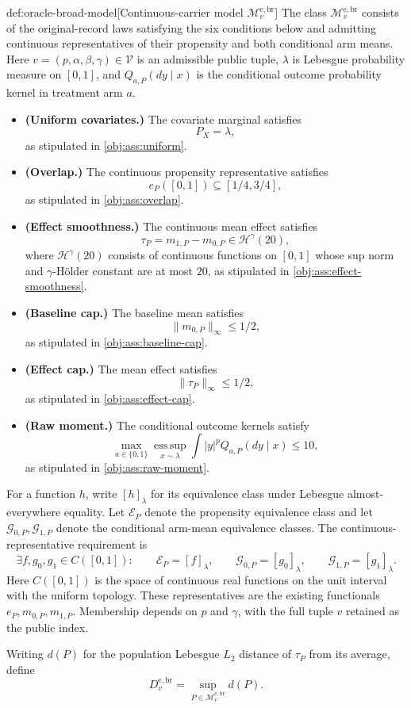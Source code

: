 \begin{definitionv}{def:oracle-broad-model}[Continuous-carrier model \(\mathcal M_v^{\mathrm{e,br}}\)]
The class \(\mathcal M_v^{\mathrm{e,br}}\) consists of the original-record laws satisfying the six conditions below and admitting continuous representatives of their propensity and both conditional arm means. Here \(v=(p,\alpha,\beta,\gamma)\in\mathcal V\) is an admissible public tuple, \(\lambda\) is Lebesgue probability measure on \([0,1]\), and \(Q_{a,P}(dy\mid x)\) is the conditional outcome probability kernel in treatment arm \(a\).
\begin{itemize}
\item \textbf{(Uniform covariates.)} The covariate marginal satisfies
\[
 P_X=\lambda,
\]
as stipulated in \cref{obj:ass:uniform}.
\item \textbf{(Overlap.)} The continuous propensity representative satisfies
\[
 e_P([0,1])\subseteq[1/4,3/4],
\]
as stipulated in \cref{obj:ass:overlap}.
\item \textbf{(Effect smoothness.)} The continuous mean effect satisfies
\[
 \tau_P=m_{1,P}-m_{0,P}\in\mathcal H^\gamma(20),
\]
where \(\mathcal H^\gamma(20)\) consists of continuous functions on \([0,1]\) whose sup norm and \(\gamma\)-Hölder constant are at most \(20\), as stipulated in \cref{obj:ass:effect-smoothness}.
\item \textbf{(Baseline cap.)} The baseline mean satisfies
\[
 \|m_{0,P}\|_\infty\le1/2,
\]
as stipulated in \cref{obj:ass:baseline-cap}.
\item \textbf{(Effect cap.)} The mean effect satisfies
\[
 \|\tau_P\|_\infty\le1/2,
\]
as stipulated in \cref{obj:ass:effect-cap}.
\item \textbf{(Raw moment.)} The conditional outcome kernels satisfy
\[
 \max_{a\in\{0,1\}}\operatorname*{ess\,sup}_{x\sim\lambda}
 \int |y|^p Q_{a,P}(dy\mid x)\le10,
\]
as stipulated in \cref{obj:ass:raw-moment}.
\end{itemize}
For a function \(h\), write \([h]_\lambda\) for its equivalence class under Lebesgue almost-everywhere equality. Let \(\mathcal E_P\) denote the propensity equivalence class and let \(\mathcal G_{0,P},\mathcal G_{1,P}\) denote the conditional arm-mean equivalence classes. The continuous-representative requirement is
\[
 \exists f,g_0,g_1\in C([0,1]):\qquad
 \mathcal E_P=[f]_\lambda,\qquad
 \mathcal G_{0,P}=[g_0]_\lambda,\qquad
 \mathcal G_{1,P}=[g_1]_\lambda.
\]
Here \(C([0,1])\) is the space of continuous real functions on the unit interval with the uniform topology. These representatives are the existing functionals \(e_P,m_{0,P},m_{1,P}\). Membership depends on \(p\) and \(\gamma\), with the full tuple \(v\) retained as the public index.

Writing \(d(P)\) for the population Lebesgue \(L_2\) distance of \(\tau_P\) from its average, define
\[
 D_v^{\mathrm{e,br}}=\sup_{P\in\mathcal M_v^{\mathrm{e,br}}}d(P).
\]
\end{definitionv}

